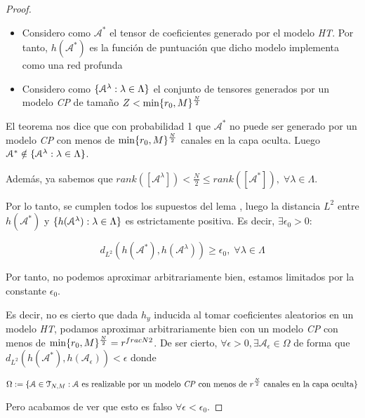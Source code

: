 \begin{proof}
    \begin{itemize}
        \item Considero como $\mathcal{A}^*$ el tensor de coeficientes generado por el modelo \textit{HT}. Por tanto, $h(\mathcal{A}^*)$ es la función de puntuación que dicho modelo implementa como una red profunda
        \item Considero como $\{ \mathcal{A}^\lambda: \lambda \in \Lambda \}$ el conjunto de tensores generados por un modelo \textit{CP} de tamaño $Z < \min \{ r_0, M \}^{\frac{N}{2}}$
    \end{itemize}

    El teorema  nos dice que con probabilidad 1 que $\mathcal{A}^*$ no puede ser generado por un modelo \textit{CP} con menos de $\min \{ r_0, M \}^{\frac{N}{2}}$ canales en la capa oculta. Luego $\mathcal{A}^* \notin \{ \mathcal{A}^\lambda: \lambda \in \Lambda \}$.

    Además, ya sabemos que $rank([\mathcal{A}^\lambda]) < \frac{N}{2} \leq rank([\mathcal{A}^*]), \; \forall \lambda \in \Lambda$.

    Por lo tanto, se cumplen todos los supuestos del lema , luego la distancia $L^2$ entre $h(\mathcal{A}^*)$ y $\{ h(\mathcal{A}^\lambda): \lambda \in \Lambda \}$ es estrictamente positiva. Es decir, $\exists \epsilon_0 > 0:$

    \begin{equation}
        d_{L^2}(h(\mathcal{A}^*), h(\mathcal{A}^\lambda)) \geq \epsilon_0, \; \forall \lambda \in \Lambda
    \end{equation}

    Por tanto, no podemos aproximar arbitrariamente bien, estamos limitados por la constante $\epsilon_0$.

    Es decir, no es cierto que dada $h_y$ inducida al tomar coeficientes aleatorios en un modelo \textit{HT}, podamos aproximar arbitrariamente bien con un modelo \textit{CP} con menos de $\min \{ r_0, M \}^{\frac{N}{2}} = r^{frac{N}{2}}$. De ser cierto, $\forall \epsilon > 0, \exists \mathcal{A}_\epsilon \in \Omega$ de forma que $d_{L^2}(h(\mathcal{A}^*), h(\mathcal{A}_\epsilon)) < \epsilon$ donde

    \begin{equation}
    \Omega := \{ \mathcal{A} \in \mathcal{T}_{N, M}: \mathcal{A} \text{ es realizable por un modelo \textit{CP} con menos de } r^{\frac{N}{2}} \text{ canales en la capa oculta} \}
    \end{equation}

    Pero acabamos de ver que esto es falso $\forall \epsilon < \epsilon_0$.
\end{proof}
